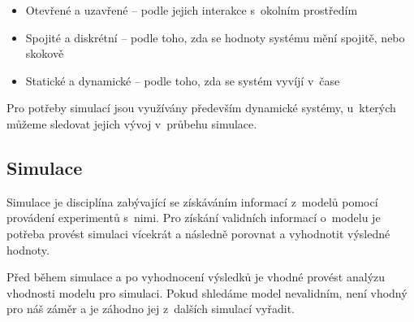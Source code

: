 \begin{itemize}
    \item Otevřené a uzavřené -- podle jejich interakce s~okolním prostředím
    \item Spojité a diskrétní -- podle toho, zda se hodnoty systému mění spojitě, nebo skokově
    \item Statické a dynamické -- podle toho, zda se systém vyvíjí v~čase
\end{itemize}
Pro potřeby simulací jsou využívány především dynamické systémy, u~kterých můžeme sledovat jejich vývoj v~průbehu simulace.

\subsection{Simulace}
Simulace je disciplína zabývající se získáváním informací z~modelů pomocí provádení experimentů s~nimi. Pro získání validních informací o~modelu je potřeba provést simulaci vícekrát a následně porovnat a vyhodnotit výsledné hodnoty.

Před během simulace a po vyhodnocení výsledků je vhodné provést analýzu vhodnosti modelu pro simulaci. Pokud shledáme model nevalidním, není vhodný pro náš záměr a je záhodno jej z~dalších simulací vyřadit.


